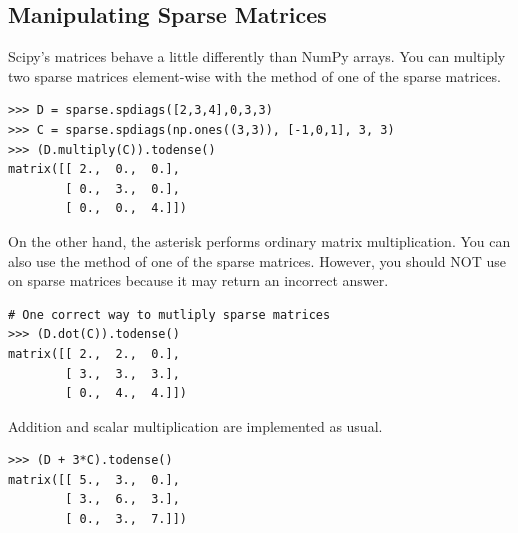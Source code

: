 \subsection*{Manipulating Sparse Matrices}
Scipy's  matrices behave a little differently than NumPy arrays.
You can multiply two sparse matrices element-wise with the  method of one of the sparse matrices.
\begin{lstlisting}
>>> D = sparse.spdiags([2,3,4],0,3,3)
>>> C = sparse.spdiags(np.ones((3,3)), [-1,0,1], 3, 3)
>>> (D.multiply(C)).todense()
matrix([[ 2.,  0.,  0.],
        [ 0.,  3.,  0.],
        [ 0.,  0.,  4.]])
\end{lstlisting}

On the other hand, the asterisk \li{*} performs ordinary matrix multiplication. 
You can also use the  method of one of the sparse matrices. 
However, you should NOT use  on sparse matrices because it may return an incorrect answer.
\begin{lstlisting}
# One correct way to mutliply sparse matrices
>>> (D.dot(C)).todense()
matrix([[ 2.,  2.,  0.],
        [ 3.,  3.,  3.],
        [ 0.,  4.,  4.]])
\end{lstlisting}

Addition and scalar multiplication are implemented as usual.
\begin{lstlisting}
>>> (D + 3*C).todense()
matrix([[ 5.,  3.,  0.],
        [ 3.,  6.,  3.],
        [ 0.,  3.,  7.]])
\end{lstlisting}




